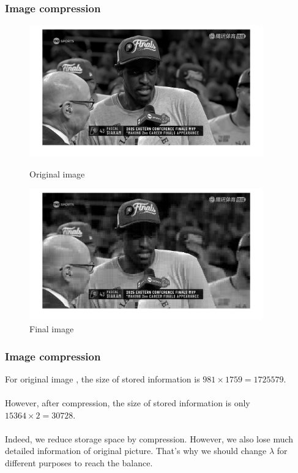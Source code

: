\documentclass{beamer}
\begin{document}
\begin{frame}
    \frametitle{Image compression}
    \begin{figure}[ht!]
        \centering
        \begin{minipage}{0.45\textwidth}
            \centering
            \includegraphics[width=0.9\textwidth]{fig/Siakam_gray.png} %
            \caption{Original image}
        \end{minipage}\hfill
        \begin{minipage}{0.45\textwidth}
            \centering
            \includegraphics[width=0.9\textwidth]{fig/Siakam_compressed.png} %
            \caption{Final image}
        \end{minipage}
    \end{figure}
\end{frame}
\begin{frame}
    \frametitle{Image compression}
    For original image , the size of stored information is $981\times1759 = 1725579$. \\\ \\
    {\color{red} However, after compression, the size of stored information is  only $15364\times2 = 30728$.} \\\ \\
    Indeed, we reduce storage space by compression. However, we also lose much detailed information of original picture. That's why we should change $\lambda$ for different purposes to reach the balance.
\end{frame}
\end{document}
